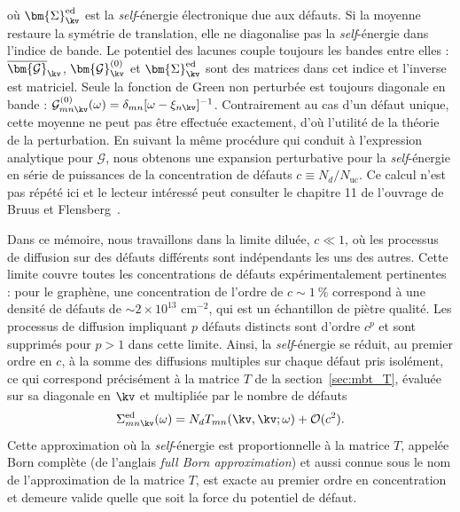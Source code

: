 où $\bm{\Sigma}_{\kv}^\text{ed}$ est la \textit{self}-énergie électronique due aux défauts. Si la moyenne restaure la symétrie de translation, elle ne diagonalise pas la \textit{self}-énergie dans l'indice de bande. Le potentiel des lacunes couple toujours les bandes entre elles : $\overline{\bm{\mathcal{G}}}_{\kv}$, $\bm{\mathcal{G}}^{(0)}_{\kv}$ et $\bm{\Sigma}^\text{ed}_{\kv}$ sont des matrices dans cet indice et l'inverse est matriciel. Seule la fonction de Green non perturbée est toujours diagonale en bande : $\mathcal{G}^{(0)}_{mn\kv}(\omega)=\delta_{mn}[\omega-\xi_{n\kv}]^{-1}$. Contrairement au cas d'un défaut unique, cette moyenne ne peut pas être effectuée exactement, d'où l'utilité de la théorie de la perturbation. En suivant la même procédure qui conduit à l'expression analytique pour $\mathcal{G}$, nous obtenons une expansion perturbative pour la \textit{self}-énergie en série de puissances de la concentration de défauts $c\equiv N_d/N_\text{uc}$. Ce calcul n'est pas répété ici et le lecteur intéressé peut consulter le chapitre 11 de l'ouvrage de Bruus et Flensberg~\cite{bruusManyBodyQuantumTheory2004}.

Dans ce mémoire, nous travaillons dans la limite diluée, $c\ll 1$, où les processus de diffusion sur des défauts différents sont indépendants les uns des autres. Cette limite couvre toutes les concentrations de défauts expérimentalement pertinentes : pour le graphène, une concentration de l'ordre de $c\sim 1~\%$ correspond à une densité de défauts de $\sim 2\times 10^{13}$ cm$^{-2}$, qui est un échantillon de piètre qualité. Les processus de diffusion impliquant $p$ défauts distincts sont d'ordre $c^p$ et sont supprimés pour $p>1$ dans cette limite. Ainsi, la \textit{self}-énergie se réduit, au premier ordre en $c$, à la somme des diffusions multiples sur chaque défaut pris isolément, ce qui correspond précisément à la matrice $T$ de la section~\ref{sec:mbt_T}, évaluée sur sa diagonale en $\kv$ et multipliée par le nombre de défauts~\cite{bruusManyBodyQuantumTheory2004}
\begin{equation}
    \Sigma_{mn\kv }^\text{ed}(\omega) = N_d T_{mn}(\kv,\kv;\omega)+\mathcal{O}(c^2).\label{eqn:sigma_diluée}
\end{equation}
Cette approximation où la \textit{self}-énergie est proportionnelle à la matrice $T$, appelée Born complète (de l'anglais \textit{full Born approximation}) et aussi connue sous le nom de l'approximation de la matrice $T$, est exacte au premier ordre en concentration et demeure valide quelle que soit la force du potentiel de défaut.

